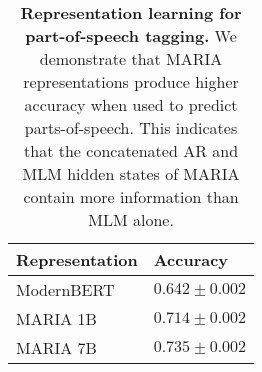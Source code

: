 \begin{table}[t]
\centering
\vspace{0.5cm}
\begin{tabular}{l l}
\toprule
Representation & Accuracy  \\
\midrule
ModernBERT & $0.642 \pm 0.002$ \\
MARIA 1B & $0.714 \pm 0.002$ \\
MARIA 7B & $0.735 \pm 0.002$ \\
\bottomrule

\end{tabular}
\vspace{0.5cm}
\caption{\textbf{Representation learning for part-of-speech tagging.} We demonstrate that MARIA representations produce higher accuracy when used to predict parts-of-speech. This indicates that the concatenated AR and MLM hidden states of MARIA contain more information than MLM alone.}
\label{tab:representation}

\end{table}
